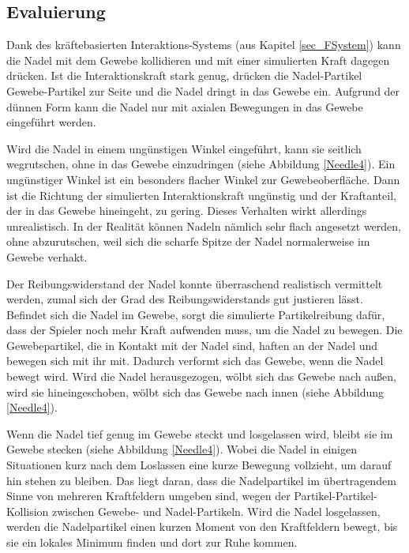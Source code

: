 


\subsection{Evaluierung}

Dank des  kräftebasierten Interaktions-Systems (aus Kapitel \ref{sec_FSystem}) kann die Nadel mit dem Gewebe kollidieren und mit einer simulierten Kraft dagegen drücken. 
Ist die Interaktionskraft stark genug, drücken die Nadel-Partikel Gewebe-Partikel zur Seite und die Nadel dringt in das Gewebe ein.
Aufgrund der dünnen Form kann die Nadel nur mit axialen Bewegungen in das Gewebe eingeführt werden. 

Wird die Nadel in einem ungünstigen Winkel eingeführt, kann sie seitlich wegrutschen, ohne in das Gewebe einzudringen (siehe Abbildung \ref{Needle4}). Ein ungünstiger Winkel ist ein besonders flacher Winkel zur Gewebeoberfläche. Dann ist die Richtung der simulierten Interaktionskraft ungünstig und der Kraftanteil, der in das Gewebe hineingeht, zu gering. Dieses Verhalten wirkt allerdings unrealistisch. In der Realität können Nadeln nämlich sehr flach angesetzt werden, ohne abzurutschen, weil sich die scharfe Spitze der Nadel normalerweise im Gewebe verhakt. 

Der Reibungswiderstand der Nadel konnte überraschend realistisch vermittelt werden, zumal sich der Grad des Reibungswiderstands gut justieren lässt. 
Befindet sich die Nadel im Gewebe, sorgt die simulierte Partikelreibung dafür, dass der Spieler noch mehr Kraft aufwenden muss, um die Nadel zu bewegen. Die Gewebepartikel, die in Kontakt mit der Nadel sind, haften an der Nadel und bewegen sich mit ihr mit. Dadurch verformt sich das Gewebe, wenn die Nadel bewegt wird. Wird die Nadel herausgezogen, wölbt sich das Gewebe nach außen, wird sie hineingeschoben, wölbt sich das Gewebe nach innen (siehe Abbildung \ref{Needle4}).


Wenn die Nadel tief genug im Gewebe steckt und losgelassen wird, bleibt sie im Gewebe stecken (siehe Abbildung \ref{Needle4}). Wobei die Nadel in einigen Situationen kurz nach dem Loslassen eine kurze Bewegung vollzieht, um darauf hin stehen zu bleiben. Das liegt daran, dass die Nadelpartikel im übertragendem Sinne von mehreren Kraftfeldern umgeben sind, wegen der Partikel-Partikel-Kollision zwischen Gewebe- und Nadel-Partikeln. Wird die Nadel losgelassen, werden die Nadelpartikel einen kurzen Moment von den Kraftfeldern bewegt, bis sie ein lokales Minimum finden und dort zur Ruhe kommen. 

